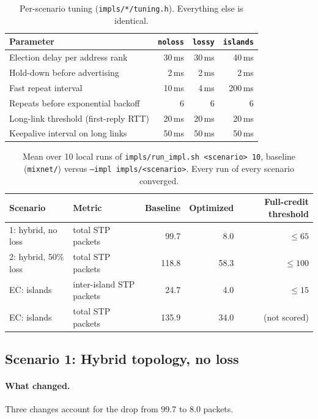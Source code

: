 \documentclass[11pt]{article}
\begin{document}
\begin{table}[h]
\centering
\begin{tabular}{lrrr}
\toprule
Parameter & \texttt{noloss} & \texttt{lossy} & \texttt{islands} \\
\midrule
Election delay per address rank & 30\,ms & 30\,ms & 40\,ms \\
Hold-down before advertising & 2\,ms & 2\,ms & 2\,ms \\
Fast repeat interval & 10\,ms & 4\,ms & 200\,ms \\
Repeats before exponential backoff & 6 & 6 & 6 \\
Long-link threshold (first-reply RTT) & 20\,ms & 20\,ms & 20\,ms \\
Keepalive interval on long links & 50\,ms & 50\,ms & 50\,ms \\
\bottomrule
\end{tabular}
\caption{Per-scenario tuning (\texttt{impls/*/tuning.h}). Everything else is identical.}
\end{table}

\begin{table}[h]
\centering
\begin{tabular}{llrrr}
\toprule
Scenario & Metric & Baseline & Optimized & Full-credit threshold \\
\midrule
1: hybrid, no loss & total STP packets & 99.7 & 8.0 & $\le 65$ \\
2: hybrid, 50\% loss & total STP packets & 118.8 & 58.3 & $\le 100$ \\
EC: islands & inter-island STP packets & 24.7 & 4.0 & $\le 15$ \\
EC: islands & total STP packets & 135.9 & 34.0 & (not scored) \\
\bottomrule
\end{tabular}
\caption{Mean over 10 local runs of \texttt{impls/run\_impl.sh <scenario> 10}, baseline (\texttt{mixnet/}) versus \texttt{--impl impls/<scenario>}. Every run of every scenario converged.}
\end{table}

\subsection{Scenario 1: Hybrid topology, no loss}

\paragraph{What changed.}
Three changes account for the drop from 99.7 to 8.0 packets.
\end{document}
